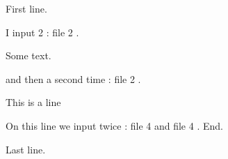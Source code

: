 \documentclass[a4paper,oneside,11pt]{article}
\begin{document}
First line.


I input 2 : file 2
.

Some text.

and then a second time : file 2
.




This is a line

On this line we input twice : file 4
 and file 4
. End.

Last line.
\end{document}
